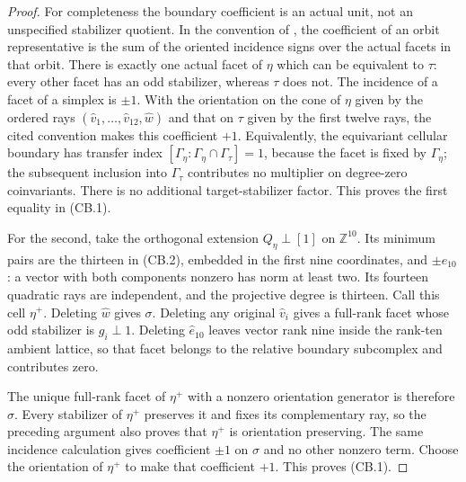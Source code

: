 \begin{proof}
For completeness the boundary coefficient is an actual unit,
not an unspecified stabilizer quotient. In the convention of
\cite[\S1.2.1, equations~(1)--(2), p.~4]{DEKM2026}, the coefficient
of an orbit representative is the sum of the oriented incidence
signs over the actual facets in that orbit. There is exactly one
actual facet of $\eta$ which can be equivalent to $\tau$: every
other facet has an odd stabilizer, whereas $\tau$ does not.
The incidence of a facet of a simplex is $\pm1$. With the
orientation on the cone of $\eta$ given by the ordered rays
$(\widehat v_1,\ldots,\widehat v_{12},\widehat w)$ and that on
$\tau$ given by the first twelve rays, the cited convention
makes this coefficient $+1$. Equivalently, the equivariant
cellular boundary has transfer index
$[\Gamma_\eta:\Gamma_\eta\cap\Gamma_\tau]=1$, because the facet
is fixed by $\Gamma_\eta$; the subsequent inclusion into
$\Gamma_\tau$ contributes no multiplier on degree-zero
coinvariants. There is no additional target-stabilizer factor.
This proves the first equality in (CB.1).

For the second, take the orthogonal extension
$Q_\eta\perp[1]$ on $\mathbb Z^{10}$. Its minimum pairs are
the thirteen in (CB.2), embedded in the first nine coordinates,
and $\pm e_{10}$: a vector with both components nonzero has
norm at least two. Its fourteen quadratic rays are independent,
and the projective degree is thirteen. Call this cell $\eta^+$.
Deleting $\widehat w$ gives $\sigma$. Deleting any original
$\widehat v_i$ gives a full-rank facet whose odd stabilizer is
$g_i\perp1$. Deleting $\widehat e_{10}$ leaves vector rank nine
inside the rank-ten ambient lattice, so that facet belongs to
the relative boundary subcomplex and contributes zero.

The unique full-rank facet of $\eta^+$ with a nonzero orientation
generator is therefore $\sigma$. Every stabilizer of $\eta^+$
preserves it and fixes its complementary ray, so the preceding
argument also proves that $\eta^+$ is orientation preserving.
The same incidence calculation gives coefficient $\pm1$ on
$\sigma$ and no other nonzero term. Choose the orientation of
$\eta^+$ to make that coefficient $+1$. This proves (CB.1).
\end{proof}

